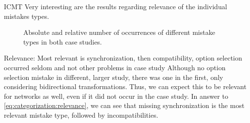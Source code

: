 \begin{copiedFrom}{ICMT}
Very interesting are the results regarding relevance of the individual mistakes types.

\begin{figure}
    \caption[Number of occurrences of mistake types]{Absolute and relative number of occurrences of different mistake types in both case studies.}
    \label{fig:correctness_evaluation:errors:mistake_type_numbers}
\end{figure}

Relevance: Most relevant is synchronization, then compatibility, option selection occurred seldom and not other problems in case study
Although no option selection mistake in different, larger study, there was one in the first, only considering bidirectional transformations. Thus, we can expect this to be relevant for networks as well, even if it did not occur in the case study.
In answer to \autoref{eq:categorization:relevance}, we can see that missing synchronization is the most relevant mistake type, followed by incompatibilities.



\end{copiedFrom}
